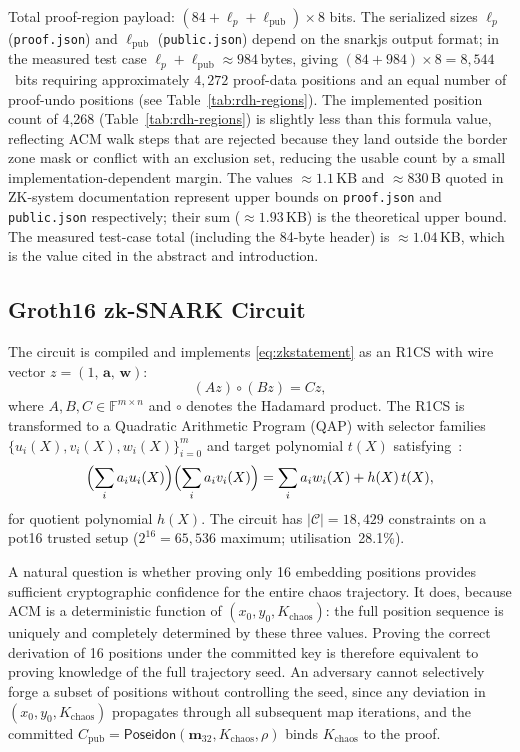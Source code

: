 \documentclass{jstarticle}
\begin{document}
\noindent
Total proof-region payload: $(84 + \ell_p + \ell_{\text{pub}}) \times 8$ bits.
The serialized sizes $\ell_p$ (\texttt{proof.json}) and $\ell_{\text{pub}}$ (\texttt{public.json}) depend on the snarkjs output format; in the measured test case $\ell_p + \ell_{\text{pub}} \approx 984$\,bytes, giving $(84 + 984) \times 8 = 8{,}544$~bits requiring approximately $4{,}272$ proof-data positions and an equal number of proof-undo positions (see Table~\ref{tab:rdh-regions}). The implemented position count of 4,268 (Table~\ref{tab:rdh-regions}) is slightly less than this formula value, reflecting ACM walk steps that are rejected because they land outside the border zone mask or conflict with an exclusion set, reducing the usable count by a small implementation-dependent margin.
The values $\approx 1.1$\,KB and $\approx 830$\,B quoted in ZK-system documentation represent upper bounds on \texttt{proof.json} and \texttt{public.json} respectively; their sum ($\approx 1.93$\,KB) is the theoretical upper bound.
The measured test-case total (including the 84-byte header) is $\approx 1.04$\,KB, which is the value cited in the abstract and introduction.

\subsection{Groth16 zk-SNARK Circuit}

The circuit is compiled and implements \eqref{eq:zkstatement} as an R1CS with wire vector $z = (1,\, \mathbf{a},\, \mathbf{w})$:
\begin{equation}
(Az) \circ (Bz) = Cz,
\label{eq:r1cs}
\end{equation}
where $A, B, C \in \mathbb{F}^{m \times n}$ and $\circ$ denotes the Hadamard product.
The R1CS is transformed to a Quadratic Arithmetic Program (QAP) with selector families $\{u_i(X), v_i(X), w_i(X)\}_{i=0}^{m}$ and target polynomial $t(X)$ satisfying~\cite{b16}:
\begin{equation}
\Bigl(\sum_{i} a_i u_i(X)\Bigr) \Bigl(\sum_{i} a_i v_i(X)\Bigr)
= \sum_{i} a_i w_i(X) + h(X)\,t(X),
\label{eq:qap}
\end{equation}
for quotient polynomial $h(X)$.
The circuit has $|\mathcal{C}| = 18{,}429$ constraints on a pot16 trusted setup ($2^{16} = 65{,}536$ maximum; utilisation~28.1\%).

A natural question is whether proving only 16 embedding positions provides sufficient cryptographic confidence for the entire chaos trajectory.
It does, because ACM is a deterministic function of $(x_0, y_0, K_{\text{chaos}})$: the full position sequence is uniquely and completely determined by these three values.
Proving the correct derivation of 16 positions under the committed key is therefore equivalent to proving knowledge of the full trajectory seed.
An adversary cannot selectively forge a subset of positions without controlling the seed, since any deviation in $(x_0, y_0, K_{\text{chaos}})$ propagates through all subsequent map iterations, and the committed $C_{\text{pub}} = \mathsf{Poseidon}(\mathbf{m}_{32}, K_{\text{chaos}}, \rho)$ binds $K_{\text{chaos}}$ to the proof.
\end{document}

